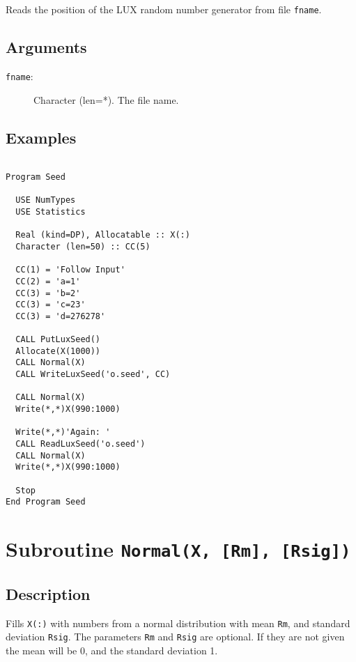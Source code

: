 Reads the position of the LUX random number generator from file
\texttt{fname}.

\subsection{Arguments}

\begin{description}
\item[\texttt{fname}:] Character (len=*). The file name.
\end{description}

\subsection{Examples}

\begin{lstlisting}[emph=ReadLuxSeed,
                   emphstyle=\color{blue},
                   frame=trBL,
                   caption=Using a previously saved point in the generating process.,
                   label=readluxseed]

Program Seed

  USE NumTypes
  USE Statistics

  Real (kind=DP), Allocatable :: X(:)
  Character (len=50) :: CC(5)

  CC(1) = 'Follow Input'
  CC(2) = 'a=1'
  CC(3) = 'b=2'
  CC(3) = 'c=23'
  CC(3) = 'd=276278'

  CALL PutLuxSeed()
  Allocate(X(1000))
  CALL Normal(X)
  CALL WriteLuxSeed('o.seed', CC)

  CALL Normal(X)
  Write(*,*)X(990:1000)

  Write(*,*)'Again: '
  CALL ReadLuxSeed('o.seed')
  CALL Normal(X)
  Write(*,*)X(990:1000)

  Stop
End Program Seed
\end{lstlisting}


\section{Subroutine \texttt{Normal(X, [Rm], [Rsig])}}

\subsection{Description}

Fills \texttt{X(:)} with numbers from a normal distribution with mean
\texttt{Rm}, and standard deviation \texttt{Rsig}. The parameters
\texttt{Rm} and \texttt{Rsig} are optional. If they are not given the
mean will be 0, and the standard deviation 1.


